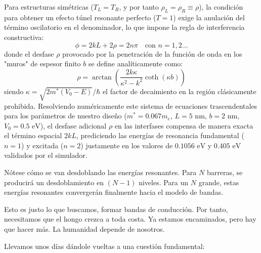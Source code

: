 \documentclass[a4paper,12pt]{article}
\begin{document}
Para estructuras simétricas ($T_L = T_R$, y por tanto $\rho_L = \rho_R \equiv \rho$), la condición para obtener un efecto túnel resonante perfecto ($T = 1$) exige la anulación del término oscilatorio en el denominador, lo que impone la regla de interferencia constructiva:
\begin{equation}
\phi = 2kL + 2\rho = 2n\pi \quad \text{con } n=1, 2\dots
\end{equation}
donde el desfase $\rho$ provocado por la penetración de la función de onda en los "muros" de espesor finito $b$ se define analíticamente como:
\begin{equation}
\rho = \arctan \left( \frac{2k\kappa}{\kappa^2 - k^2} \coth(\kappa b) \right)
\end{equation}
siendo $\kappa = \sqrt{2m^*(V_0-E)}/\hbar$ el factor de decaimiento en la región clásicamente prohibida. Resolviendo numéricamente este sistema de ecuaciones trascendentales para los parámetros de nuestro diseño ($m^* = 0.067m_e$, $L = 5\text{ nm}$, $b = 2\text{ nm}$, $V_0 = 0.5\text{ eV}$), el desfase adicional $\rho$ en las interfases compensa de manera exacta el término espacial $2kL$, prediciendo las energías de resonancia fundamental ($n=1$) y excitada ($n=2$) justamente en los valores de $0.1056\text{ eV}$ y $0.405\text{ eV}$ validados por el simulador.

Nótese cómo se van desdoblando las energías resonantes. Para $N$ barreras, se producirá un desdoblamiento en $(N-1)$ niveles. Para un $N$ grande, estas energías resonantes convergerán finalmente hacia el modelo de bandas.


Esto es justo lo que buscamos, formar bandas de conducción. Por tanto, necesitamos que el hongo crezca a toda costa. Ya estamos encaminados, pero hay que hacer más. La humanidad depende de nosotros.





Llevamos unos días dándole vueltas a una cuestión fundamental:
\end{document}
